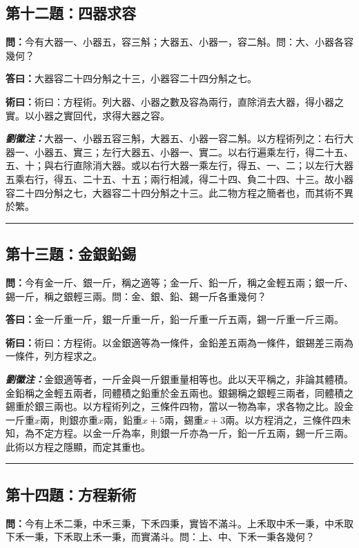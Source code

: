 \documentclass[11pt,a4paper]{article}
\newcommand{\wen}[1]{\textbf{\color{problemcolor}問：}#1\par}
\newcommand{\da}[1]{\textbf{答曰：}#1\par}
\newcommand{\shu}[1]{\textbf{術曰：}#1\par}
\newcommand{\liuhui}[1]{{\color{commentarycolor}\textit{\textbf{劉徽注：}}#1\par}}
\begin{document}
\subsection{第十二題：四器求容}

\wen{今有大器一、小器五，容三斛；大器五、小器一，容二斛。問：大、小器各容幾何？}

\da{大器容二十四分斛之十三，小器容二十四分斛之七。}

\shu{術曰：方程術。列大器、小器之數及容為兩行，直除消去大器，得小器之實。以小器之實回代，求得大器之容。}

\liuhui{大器一、小器五容三斛，大器五、小器一容二斛。以方程術列之：右行大器一、小器五、實三；左行大器五、小器一、實二。以右行遍乘左行，得二十五、五、十；與右行直除消大器。或以右行大器一乘左行，得五、一、二；以左行大器五乘右行，得五、二十五、十五；兩行相減，得二十四、負二十四、十三。故小器容二十四分斛之七，大器容二十四分斛之十三。此二物方程之簡者也，而其術不異於繁。}

\bigskip
\hrule
\bigskip

\subsection{第十三題：金銀鉛錫}

\wen{今有金一斤、銀一斤，稱之適等；金一斤、鉛一斤，稱之金輕五兩；銀一斤、錫一斤，稱之銀輕三兩。問：金、銀、鉛、錫一斤各重幾何？}

\da{金一斤重一斤，銀一斤重一斤，鉛一斤重一斤五兩，錫一斤重一斤三兩。}

\shu{術曰：方程術。以金銀適等為一條件，金鉛差五兩為一條件，銀錫差三兩為一條件，列方程求之。}

\liuhui{金銀適等者，一斤金與一斤銀重量相等也。此以天平稱之，非論其體積。金鉛稱之金輕五兩者，同體積之鉛重於金五兩也。銀錫稱之銀輕三兩者，同體積之錫重於銀三兩也。以方程術列之，三條件四物，當以一物為率，求各物之比。設金一斤重$x$兩，則銀亦重$x$兩，鉛重$x+5$兩，錫重$x+3$兩。以方程消之，三條件四未知，為不定方程。以金一斤為率，則銀一斤亦為一斤，鉛一斤五兩，錫一斤三兩。此術以方程之隱顯，而定其重也。}

\bigskip
\hrule
\bigskip

\subsection{第十四題：方程新術}

\wen{今有上禾二秉，中禾三秉，下禾四秉，實皆不滿斗。上禾取中禾一秉，中禾取下禾一秉，下禾取上禾一秉，而實滿斗。問：上、中、下禾一秉各幾何？}
\end{document}
